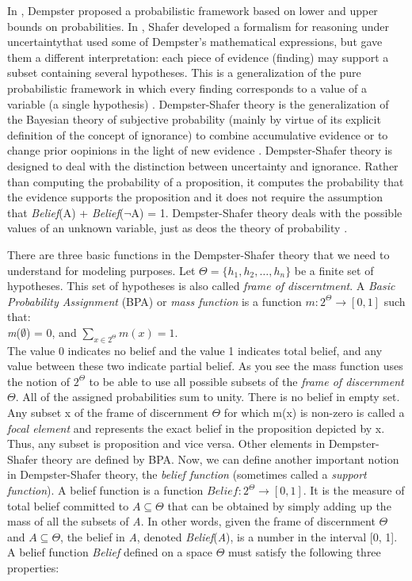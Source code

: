 \documentclass[11pt]{article}
\begin{document}
In \cite{dempster:theory}, Dempster proposed a probabilistic framework based on
lower and upper bounds on probabilities. In \cite{shafer:evidence-theory},
Shafer developed a formalism for reasoning under uncertaintythat used some of
Dempster's mathematical expressions, but gave them a different interpretation:
each piece of evidence (finding) may support a subset containing several
hypotheses. This is a generalization of the pure probabilistic framework in
which every finding corresponds to a value of a variable (a single hypothesis)
\cite{diez:reasoning-uncertainty}. Dempster-Shafer theory is the generalization
of the Bayesian theory of subjective probability (mainly by virtue of its
explicit definition of the concept of ignorance) to combine accumulative
evidence or to change prior oopinions in the light of new evidence
\cite{das:decision-making-agents}. Dempster-Shafer theory is designed to deal
with the distinction between uncertainty and ignorance. Rather than computing
the probability of a proposition, it computes the probability that the evidence
supports the proposition \cite{russell:ai-modern} and it does not require the
assumption that \textit{Belief}(A) + \textit{Belief}($\neg$A) = 1. Dempster-Shafer
theory deals with the possible values of an unknown variable, just as deos the
theory of probability \cite{tanimoto:ai-lisp}. 

There are three basic functions in the Dempster-Shafer theory that we need to
understand for modeling purposes. Let $\Theta=\{h_1,h_2, \ldots, h_n\}$ be a
finite set of hypotheses. This set of hypotheses is also called \textit{frame of
discerntment}. A \textit{Basic Probability Assignment} (BPA) or \textit{mass
function} is a function $m:2^\Theta\rightarrow[0,1]$ such that:\\

\textit{m}($\emptyset$) = 0, and $\sum\limits_{x\in2^\Theta}m(x) =1$.\\

The value 0 indicates no belief and the value 1 indicates total belief, and
any value between these two indicate partial belief. As you see the mass
function uses the notion of $2^\Theta$ to be able to use all possible subsets of
the \textit{frame of discernment} $\Theta$. All of the assigned probabilities
sum to unity. There is no belief in empty set. Any subset x of the frame of
discernment $\Theta$ for which m(x) is non-zero is called a \textit{focal
element} and represents the exact belief in the proposition depicted by x. Thus,
any subset is proposition and vice versa. Other elements in Dempster-Shafer
theory are defined by BPA. Now, we can define another important notion in
Dempster-Shafer theory, the \textit{belief function} (sometimes called a
\textit{support function}). A belief function is a function
$Belief:2^\Theta\rightarrow[0,1]$. It is the measure of total belief committed
to $A \subseteq \Theta$ that can be obtained by simply adding up the mass of all
the subsets of \textit{A}. In other words, given the frame of discernment
$\Theta$ and $A \subseteq \Theta$, the belief in \textit{A}, denoted
\textit{Belief}(\textit{A}), is a number in the interval [0, 1]. A belief
function \textit{Belief} defined on a space $\Theta$ must satisfy the following
three properties:
\end{document}
